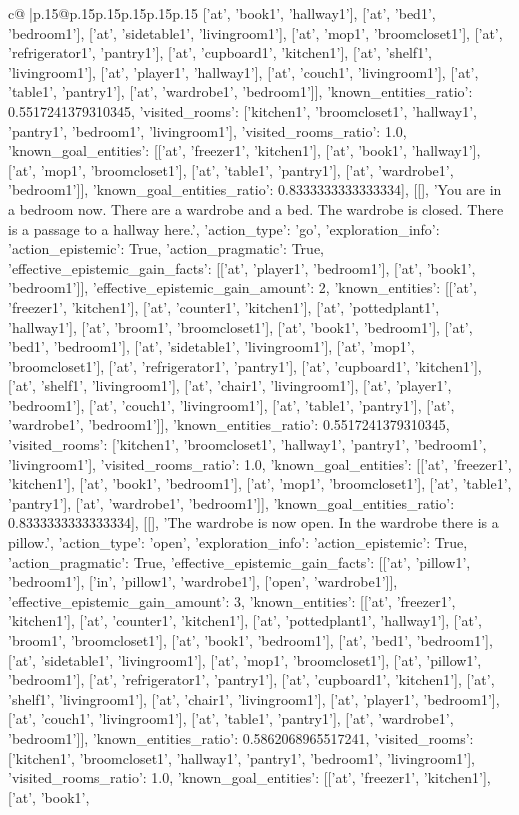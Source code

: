 \documentclass{article}
\begin{document}
{\begin{supertabular}{c@{$\;$}|p{.15\linewidth}@{}p{.15\linewidth}p{.15\linewidth}p{.15\linewidth}p{.15\linewidth}p{.15\linewidth}}
{{{['at', 'book1', 'hallway1'], ['at', 'bed1', 'bedroom1'], ['at', 'sidetable1', 'livingroom1'], ['at', 'mop1', 'broomcloset1'], ['at', 'refrigerator1', 'pantry1'], ['at', 'cupboard1', 'kitchen1'], ['at', 'shelf1', 'livingroom1'], ['at', 'player1', 'hallway1'], ['at', 'couch1', 'livingroom1'], ['at', 'table1', 'pantry1'], ['at', 'wardrobe1', 'bedroom1']], 'known_entities_ratio': 0.5517241379310345, 'visited_rooms': ['kitchen1', 'broomcloset1', 'hallway1', 'pantry1', 'bedroom1', 'livingroom1'], 'visited_rooms_ratio': 1.0, 'known_goal_entities': [['at', 'freezer1', 'kitchen1'], ['at', 'book1', 'hallway1'], ['at', 'mop1', 'broomcloset1'], ['at', 'table1', 'pantry1'], ['at', 'wardrobe1', 'bedroom1']], 'known_goal_entities_ratio': 0.8333333333333334}}], [[], 'You are in a bedroom now. There are a wardrobe and a bed. The wardrobe is closed. There is a passage to a hallway here.', {'action_type': 'go', 'exploration_info': {'action_epistemic': True, 'action_pragmatic': True, 'effective_epistemic_gain_facts': [['at', 'player1', 'bedroom1'], ['at', 'book1', 'bedroom1']], 'effective_epistemic_gain_amount': 2, 'known_entities': [['at', 'freezer1', 'kitchen1'], ['at', 'counter1', 'kitchen1'], ['at', 'pottedplant1', 'hallway1'], ['at', 'broom1', 'broomcloset1'], ['at', 'book1', 'bedroom1'], ['at', 'bed1', 'bedroom1'], ['at', 'sidetable1', 'livingroom1'], ['at', 'mop1', 'broomcloset1'], ['at', 'refrigerator1', 'pantry1'], ['at', 'cupboard1', 'kitchen1'], ['at', 'shelf1', 'livingroom1'], ['at', 'chair1', 'livingroom1'], ['at', 'player1', 'bedroom1'], ['at', 'couch1', 'livingroom1'], ['at', 'table1', 'pantry1'], ['at', 'wardrobe1', 'bedroom1']], 'known_entities_ratio': 0.5517241379310345, 'visited_rooms': ['kitchen1', 'broomcloset1', 'hallway1', 'pantry1', 'bedroom1', 'livingroom1'], 'visited_rooms_ratio': 1.0, 'known_goal_entities': [['at', 'freezer1', 'kitchen1'], ['at', 'book1', 'bedroom1'], ['at', 'mop1', 'broomcloset1'], ['at', 'table1', 'pantry1'], ['at', 'wardrobe1', 'bedroom1']], 'known_goal_entities_ratio': 0.8333333333333334}}], [[], 'The wardrobe is now open. In the wardrobe there is a pillow.', {'action_type': 'open', 'exploration_info': {'action_epistemic': True, 'action_pragmatic': True, 'effective_epistemic_gain_facts': [['at', 'pillow1', 'bedroom1'], ['in', 'pillow1', 'wardrobe1'], ['open', 'wardrobe1']], 'effective_epistemic_gain_amount': 3, 'known_entities': [['at', 'freezer1', 'kitchen1'], ['at', 'counter1', 'kitchen1'], ['at', 'pottedplant1', 'hallway1'], ['at', 'broom1', 'broomcloset1'], ['at', 'book1', 'bedroom1'], ['at', 'bed1', 'bedroom1'], ['at', 'sidetable1', 'livingroom1'], ['at', 'mop1', 'broomcloset1'], ['at', 'pillow1', 'bedroom1'], ['at', 'refrigerator1', 'pantry1'], ['at', 'cupboard1', 'kitchen1'], ['at', 'shelf1', 'livingroom1'], ['at', 'chair1', 'livingroom1'], ['at', 'player1', 'bedroom1'], ['at', 'couch1', 'livingroom1'], ['at', 'table1', 'pantry1'], ['at', 'wardrobe1', 'bedroom1']], 'known_entities_ratio': 0.5862068965517241, 'visited_rooms': ['kitchen1', 'broomcloset1', 'hallway1', 'pantry1', 'bedroom1', 'livingroom1'], 'visited_rooms_ratio': 1.0, 'known_goal_entities': [['at', 'freezer1', 'kitchen1'], ['at', 'book1', }}}
\end{supertabular}}
\end{document}

